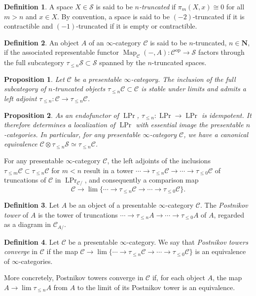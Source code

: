 \documentclass[12pt]{article}
\newtheorem{proposition}{Proposition}[subsection]
\theoremstyle{definition}
\newtheorem{definition}{Definition}[subsection]
\newcommand{\C}{\mathcal{C}}
\renewcommand{\S}{\mathcal{S}}
\newcommand{\NN}{\mathbf{N}}
\renewcommand{\i}{\infty}
\newcommand{\too}{\longrightarrow}
\newcommand{\op}{\mathrm{op}}
\DeclareMathOperator{\Map}{Map}
\DeclareMathOperator{\PrL}{LPr}
\begin{document}
\begin{definition}
A space $X\in\S$ is said to be {\em $n$-truncated}  if 
$
\pi_m(X,x)\cong 0
$
for all  $m>n$ and  $x\in X$.
By convention, a space is said to be $(-2)$-truncated if it is contractible and $(-1)$-truncated if it is empty or contractible.
\end{definition}

\begin{definition}\label{def:ntrunc}
An object $A$ of an $\i$-category $\C$ is said to be $n$-truncated, $n\in\NN$,
if the associated representable functor $\Map_\C(-,A):\C^{\op}\to\S$
factors through the full subcategory $\tau_{\leq n}\S\subset\S$ spanned by the $n$-truncated spaces.
\end{definition}
\begin{proposition}{\em \cite[Proposition 5.5.6.18]{HTT}}
Let $\C$ be a presentable $\i$-category.
The inclusion of the full subcategory of $n$-truncated objects $\tau_{\leq n}\C\subset\C$ is stable under limits and admits a left adjoint $\tau_{\leq n}:\C\to\tau_{\leq n}\C$.
\end{proposition}

\begin{proposition}{\em \cite[Example 4.8.1.22]{HA}}
As an endofunctor of $\PrL$, $\tau_{\leq n}:\PrL\to\PrL$ is idempotent.
It therefore determines a localization of $\PrL$ with essential image the presentable $n$-categories.
In particular, for any presentable $\infty$-category $\C$, we have a canonical equivalence 
$\C\otimes\tau_{\leq n}\S\simeq\tau_{\leq n}\C$.
\end{proposition}

For any presentable $\infty$-category $\C$, the left adjoints of the inclusions $\tau_{\leq m}\C\subset\tau_{\leq n}\C$ for $m<n$ result in a tower
$
\cdots\to\tau_{\leq n}\C\to\cdots\to\tau_{\leq 0}\C
$
of truncations of $\C$ in $\PrL_{\C/}$, and consequently a comparison map
\[
\C\too\lim\{\cdots\to\tau_{\leq n}\C\to\cdots\to\tau_{\leq 0}\C\}.
\]
\begin{definition}
Let $A$ be an object of a presentable $\i$-category $\C$.
The {\em Postnikov tower} of $A$ is the tower of truncations $\cdots\to\tau_{\leq n}A\to\cdots\to\tau_{\leq 0}A$ of $A$, regarded as a diagram in $\C_{A/}$.
\end{definition}
\begin{definition}
Let $\C$ be a presentable $\i$-category.
We say that {\em Postnikov towers converge} in $\C$ if the map $\C\to\lim\{\cdots\to\tau_{\leq n}\C\to\cdots\to\tau_{\leq 0}\C\}$ is an equivalence of $\infty$-categories.
\end{definition}
More concretely, Postnikov towers converge in $\C$ if, for each object $A$, the map $A\to\lim\tau_{\leq n}A$ from $A$ to the limit of its Postnikov tower is an equivalence.
\end{document}

